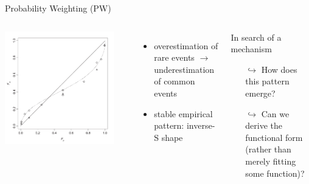 \begin{frame}{Probability Weighting (PW)}

\begin{columns}[T]
	\includegraphics[width=.9\textwidth]{img/TK1992.pdf}

\parencite[p. 310, Fig. 1,relabelled axes]{TverskyKahneman1992}

\begin{itemize}
  \item overestimation of rare events $\rightarrow$ underestimation of common events
  \item stable empirical pattern: inverse-S shape
\end{itemize}

\bi
	\item	{}
\ei

\begin{block}{In search of a mechanism}
	\begin{itemize}
	  \item[$\hookrightarrow$] How does this pattern emerge?
  	\item[$\hookrightarrow$] Can we derive the functional form (rather than merely fitting some function)?
	\end{itemize}
\end{block}

\end{columns}
\end{frame}

